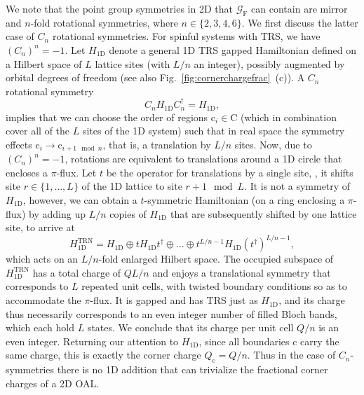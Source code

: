 We note that the point group symmetries in 2D that $\mathcal{G}_\mathrm{F}$ can contain are mirror and $n$-fold rotational symmetries, where $n \in \{2,3,4,6\}$. We first discuss the latter case of $C_n$ rotational symmetries. For spinful systems with TRS, we have $(C_n)^n = -1$. Let $H_{\mathrm{1D}}$ denote a general 1D TRS gapped Hamiltonian defined on a Hilbert space of $L$ lattice sites (with $L/n$ an integer), possibly augmented by orbital degrees of freedom (see also Fig.~\ref{fig:cornerchargefrac}~(c)). A $C_n$ rotational symmetry
\begin{equation}
C_n H_{\mathrm{1D}} C_n^\dagger = H_{\mathrm{1D}},
\end{equation}
implies that we can choose the order of regions $\mathrm{c}_i \in \mathrm{C}$ (which in combination cover all of the $L$ sites of the 1D system) such that in real space the symmetry effects $\mathrm{c}_i \rightarrow \mathrm{c}_{i+1 \mod n}$, that is, a translation by $L/n$ sites. Now, due to $(C_n)^n = -1$, rotations are equivalent to translations around a 1D circle that encloses a $\pi$-flux. Let $t$ be the operator for translations by a single site, \ie, it shifts site $r \in \{1,\dots,L\}$ of the 1D lattice to site $r+1 \mod L$. It is not a symmetry of $H_{\mathrm{1D}}$, however, we can obtain a $t$-symmetric Hamiltonian (on a ring enclosing a $\pi$-flux) by adding up $L/n$ copies of $H_{\mathrm{1D}}$ that are subsequently shifted by one lattice site, to arrive at
\begin{equation}
H_{\mathrm{1D}}^{\mathrm{TRN}} = H_{\mathrm{1D}} \oplus t H_{\mathrm{1D}} t^\dagger \oplus \dots \oplus t^{L/n-1} H_{\mathrm{1D}} (t^\dagger)^{L/n-1},
\end{equation}
which acts on an $L/n$-fold enlarged Hilbert space. The occupied subspace of $H_{\mathrm{1D}}^{\mathrm{TRN}}$ has a total charge of $Q L/n$ and enjoys a translational symmetry that corresponds to $L$ repeated unit cells, with twisted boundary conditions so as to accommodate the $\pi$-flux. It is gapped and has TRS just as $H_{\mathrm{1D}}$, and its charge thus necessarily corresponds to an even integer number of filled Bloch bands, which each hold $L$ states. We conclude that its charge per unit cell $Q/n$ is an even integer. Returning our attention to $H_{\mathrm{1D}}$, since all boundaries $\mathrm{c}$ carry the same charge, this is exactly the corner charge $Q_{\mathrm{c}} = Q/n$. Thus in the case of $C_n$-symmetries there is no 1D addition that can trivialize the fractional corner charges of a 2D OAL.

